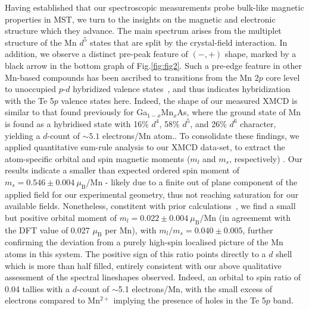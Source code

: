 \documentclass[preprint,amsmath,amssymb,aps,nofootinbib,superscriptaddress]{revtex4-2}
\begin{document}
Having established that our spectroscopic measurements probe bulk-like magnetic properties in MST, we turn to the insights on the magnetic and electronic structure which they advance. The main spectrum arises from the multiplet structure of the Mn $d^5$ states that are split by the crystal-field interaction. In addition, we observe a distinct pre-peak feature of $(-,+)$ shape, marked by a black arrow in the bottom graph of Fig.\ref{fig:fig2}. Such a pre-edge feature in other Mn-based compounds has been ascribed to transitions from the Mn $2p$ core level to unoccupied $p$-$d$ hybridized valence states~\cite{vanderLaan2010}, and thus indicates hybridization with the Te 5$p$ valence states here. Indeed, the shape of our measured XMCD is similar to that found previously for Ga$_{1-x}$Mn$_x$As, where the ground state of Mn is found as a hybridised state with 16\% $d^4$, 58\% $d^5$, and 26\% $d^6$ character, yielding a $d$-count of $\sim\!5.1$ electrons/Mn atom.\cite{APL2004Edmonds}. To consolidate these findings, we applied quantitative sum-rule analysis to our XMCD data-set, to extract the atom-specific orbital and spin magnetic moments ($m_l$ and $m_s$, respectively) \cite{PRL1992Thole,PRL1993Carra,PRB2005Edmonds}. Our results  indicate a smaller than expected ordered spin moment of $m_s=0.546\pm0.004~\mu_\mathrm{B}/\mathrm{Mn}$ - likely due to a finite out of plane component of the applied field for our experimental geometry, thus not reaching saturation for our available fields. Nonetheless, constitent with prior calculations~\cite{PRB2017May}, we find a small but positive orbital moment of $m_l=0.022\pm0.004~\mu_\mathrm{B}/\mathrm{Mn}$ (in agreememt with the DFT value of 0.027 $\mu_\mathrm{B}$ per Mn), with $m_l/m_s=0.040\pm0.005$, further confirming the deviation from a purely high-spin localised picture of the Mn atoms in this system. The positive sign of this ratio points directly to a $d$ shell which is more than half filled, entirely consistent with our above qualitative assessment of the spectral lineshapes observed. Indeed, an orbital to spin ratio of 0.04 tallies with a $d$-count of $\sim$5.1 electrons/Mn, with the small excess of electrons compared to Mn$^{2+}$ implying the presence of holes in the Te 5$p$ band.
\end{document}
